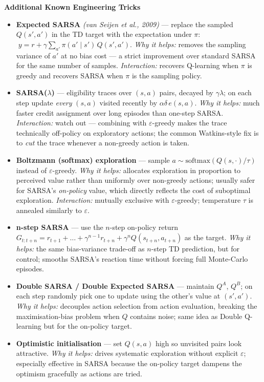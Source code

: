 \documentclass[11pt]{article}
\begin{document}
    \label{tricks-2-4}

    \textbf{Additional Known Engineering Tricks}

\begin{itemize}
\item
  \label{trick-2-4-1}\textbf{Expected SARSA} \emph{(van
  Seijen et al., 2009)} --- replace the sampled \(Q(s',a')\) in the TD
  target with the expectation under \(\pi\):
  \(\;y = r + \gamma\sum_{a'}\pi(a'\mid s')\,Q(s',a')\). \emph{Why it
  helps:} removes the sampling variance of \(a'\) at no bias cost --- a
  strict improvement over standard SARSA for the same number of samples.
  \emph{Interaction:} recovers Q-learning when \(\pi\) is greedy and
  recovers SARSA when \(\pi\) is the sampling policy.
\item
  \label{trick-2-4-2}\textbf{SARSA(\(\lambda\))} ---
  eligibility traces over \((s,a)\) pairs, decayed by \(\gamma\lambda\);
  on each step update \emph{every} \((s,a)\) visited recently by
  \(\alpha\delta\,e(s,a)\). \emph{Why it helps:} much faster credit
  assignment over long episodes than one-step SARSA. \emph{Interaction:}
  watch out --- combining with \(\varepsilon\)-greedy makes the trace
  technically off-policy on exploratory actions; the common
  Watkins-style fix is to \emph{cut} the trace whenever a non-greedy
  action is taken.
\item
  \label{trick-2-4-3}\textbf{Boltzmann (softmax)
  exploration} --- sample \(a\sim\mathrm{softmax}(Q(s,\cdot)/\tau)\)
  instead of \(\varepsilon\)-greedy. \emph{Why it helps:} allocates
  exploration in proportion to perceived value rather than uniformly
  over non-greedy actions; usually safer for SARSA's \emph{on-policy}
  value, which directly reflects the cost of suboptimal exploration.
  \emph{Interaction:} mutually exclusive with \(\varepsilon\)-greedy;
  temperature \(\tau\) is annealed similarly to \(\varepsilon\).
\item
  \label{trick-2-4-4}\textbf{n-step SARSA} --- use the
  \(n\)-step on-policy return
  \(G_{t:t+n} = r_{t+1}+\dots+\gamma^{n-1}r_{t+n}+\gamma^n Q(s_{t+n}, a_{t+n})\)
  as the target. \emph{Why it helps:} the same bias-variance trade-off
  as \(n\)-step TD prediction, but for control; smooths SARSA's reaction
  time without forcing full Monte-Carlo episodes.
\item
  \label{trick-2-4-5}\textbf{Double SARSA / Double
  Expected SARSA} --- maintain \(Q^A\), \(Q^B\); on each step randomly
  pick one to update using the other's value at \((s',a')\). \emph{Why
  it helps:} decouples action selection from action evaluation, breaking
  the maximisation-bias problem when \(Q\) contains noise; same idea as
  Double Q-learning but for the on-policy target.
\item
  \label{trick-2-4-6}\textbf{Optimistic initialisation}
  --- set \(Q(s,a)\) high so unvisited pairs look attractive. \emph{Why
  it helps:} drives systematic exploration without explicit
  \(\varepsilon\); especially effective in SARSA because the on-policy
  target dampens the optimism gracefully as actions are tried.
\end{itemize}
\end{document}
